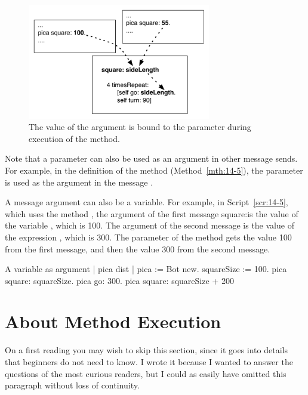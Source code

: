 \documentclass[a4paper,10pt,twoside]{book}
\begin{document}
\begin{figure}
	\begin{center}
\includegraphics[width=8cm]{argparam4}
\caption{The value of the argument is bound to the parameter during execution of the method. \label{fig:14-3}}
\end{center}
\end{figure}

Note that a parameter can also be used as an argument in other message sends. For 
example, in the definition of the method  (Method~\ref{mth:14-5}), the parameter  
is used as the argument in the message . 

A message argument can also be a variable. For example, in Script~\ref{scr:14-5}, which uses 
the method , the argument of the first message square:is the value of the variable 
, which is 100. The argument of the second message  is the value of the 
expression , which is 300. The parameter  of the method  
gets the value 100 from the first  message, and then the value 300 from the second 
 message. 

\begin{script}[14-5]{A variable as argument}
| pica dist | 
pica := Bot new. 
squareSize := 100. 
pica square: squareSize. 
pica go: 300. 
pica square: squareSize + 200 
\end{script}

\section{About Method Execution}

On a first reading you may wish to skip this section, since it goes into details that beginners 
do not need to know. I wrote it because I wanted to answer the questions of the most curious 
readers, but I could as easily have omitted this paragraph without loss of continuity. 
\end{document}
